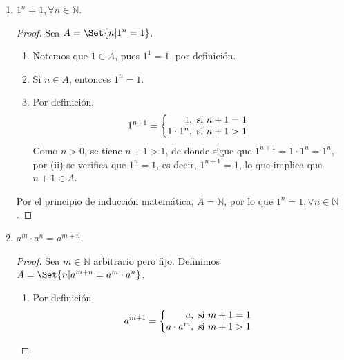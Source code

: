 \documentclass[11pt]{article}
\newcommand{\N}{\mathbb{N}}
\let\set\Set
\begin{document}
\begin{enumerate}[label=\alph*)]
    \item $1^n=1, \forall n\in \N$.
    \vspace{-1em}
    \begin{proof} Sea $A=\set{n|1^n=1}$.
    \begin{enumerate}[label=\roman*)]
    \item Notemos que $1\in A$, pues $1^1=1$, por definición.
    \item Si $n\in A$, entonces $1^n=1$.
    \item Por definición, \begin{align*}
        1^{n+1} = \left\{
            \begin{array}{@{}r@{\thinspace}l}
                1, &  \ \text{si}  \ n+1 = 1\\
                1\cdot 1^{n}, &  \ \text{si}  \ n+1 > 1
            \end{array} \right.
        \end{align*}
    Como $n>0$, se tiene $n+1>1$, de donde sigue que $1^{n+1}=1\cdot 1^n=1^n$, por (ii) se verifica que $1^n=1$, es decir, $1^{n+1}=1$, lo que implica que $n+1\in A$.
    \end{enumerate}

    Por el principio de inducción matemática, $A=\N$, por lo que $1^n=1, \forall n\in \N$.
    \end{proof} \vspace{-1em}

    \item $a^m \cdot a^n = a^{m+n}$.
    
    \vspace{-1em}
    \begin{proof} Sea $m\in \N$ arbitrario pero fijo. Definimos $A=\set{n|a^{m+n}=a^m\cdot a^n}$.

    \vspace{-1em}\begin{enumerate}[label=\roman*)]
    \item Por definición \vspace{1em}\begin{align*}
        a^{m+1} = \left\{
            \begin{array}{@{}r@{\thinspace}l}
                a, &  \ \text{si}  \ m+1 = 1\\
                a\cdot a^{m}, &  \ \text{si}  \ m+1 > 1
            \end{array} \right.
        \end{align*}\vspace{-1em}
        

\end{enumerate}
\end{proof}
\end{enumerate}
\end{document}
